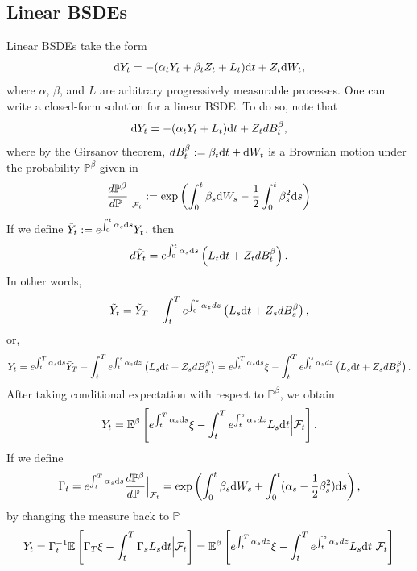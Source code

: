 \documentclass[11pt]{book}
\newcommand{\dd}{\text{\normalfont d}}
\newcommand{\dt}{\text{\normalfont d}t}
\newcommand{\ds}{\text{\normalfont d}s}
\newcommand{\dW}{\text{\normalfont d}W}
\begin{document}
\subsection{Linear BSDEs}
Linear BSDEs take the form
\begin{equation}\label{eqn:PDE_linear_BSDE}
\dd Y_t=-(\alpha_tY_t+\beta_tZ_t+L_t){\dt}+Z_t\dW_t,
\end{equation}
where $\alpha$, $\beta$, and $L$ are arbitrary progressively measurable processes.
One can write a closed-form solution for a linear BSDE. To do so, note that
\begin{equation}
	\dd Y_t=-(\alpha_tY_t+L_t){\dt}+Z_tdB^{\beta}_t,
\end{equation}
where by the Girsanov theorem, $dB^{\beta}_t:=\beta_t{\dt}+\dW_t$ is a Brownian motion under the probability $\mathbb{P}^{\beta}$ given in
\begin{equation}
	\frac{d\mathbb{P}^{\beta}}{d\mathbb{P}~}\Big|_{\mathcal{F}_t}:=\exp\left(
	\int_0^t\beta_s \dW_s-\frac12\int_0^t\beta^2_s{{\ds}}
	\right)
\end{equation}
If we define $\tilde{Y}_t:=e^{\int_0^t \alpha_s{{\ds}}}Y_t$, then
\begin{equation}
	d\tilde{Y}_t=e^{\int_0^t \alpha_s {{\ds}}}\left(L_t{\dt}+Z_tdB^{\beta}_t\right).
\end{equation}
In other words,
\begin{equation}
	\tilde{Y}_t=\tilde{Y}_T-\int_{t}^{T} e^{\int_0^s \alpha_z dz}\left(L_s{\dt}+Z_sdB^{\beta}_s\right),
\end{equation}
or, 
\begin{equation}
	{Y}_t=e^{\int_t^T \alpha_s{{\ds}}}\tilde{Y}_T-\int_{t}^{T} e^{\int_t^s \alpha_z dz}\left(L_s{\dt}+Z_sdB^{\beta}_s\right)=e^{\int_t^T \alpha_s{{\ds}}}\xi-\int_{t}^{T} e^{\int_t^s \alpha_z dz}\left(L_s{\dt}+Z_sdB^{\beta}_s\right).
\end{equation}
After taking conditional expectation with respect to $\mathbb{P}^{\beta}$, we obtain
\begin{equation}
	Y_t=\mathbb{E}^{\beta}\left[e^{\int_t^T \alpha_s {{\ds}}}\xi-\int_{t}^{T} e^{\int_t^s \alpha_z dz}L_s{\dt}
	\Big|\mathcal{F}_t\right].
\end{equation}
If we define 
\begin{equation}
	\Gamma_t=e^{\int_t^T \alpha_s {{\ds}}}\frac{d\mathbb{P}^{\beta}}{d\mathbb{P}~}\Big|_{\mathcal{F}_t}=\exp\left(
	\int_0^t\beta_s \dW_s+\int_0^t(\alpha_s-\frac12\beta^2_s){{\ds}}
	\right),
\end{equation}
by changing the measure back to $\mathbb{P}$
\begin{equation}
	Y_t=\Gamma^{-1}_t\mathbb{E}\left[\Gamma_{T} \xi-\int_{t}^{T} \Gamma_{s} L_s{\dt}
	\Big|\mathcal{F}_t\right]=\mathbb{E}^{\beta}\left[ e^{\int_t^T \alpha_z dz}\xi-\int_{t}^{T} e^{\int_t^s \alpha_z dz} L_s{\dt}
	\Big|\mathcal{F}_t\right]
\end{equation}
\end{document}
